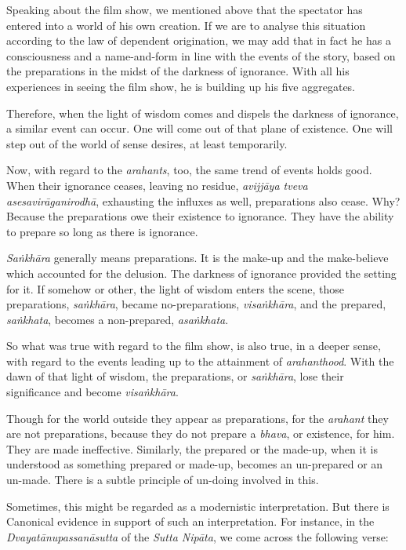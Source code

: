 Speaking about the film show, we mentioned above that the spectator has entered into a world of his own creation. If we are to analyse this situation according to the law of dependent origination, we may add that in fact he has a consciousness and a name-and-form in line with the events of the story, based on the preparations in the midst of the darkness of ignorance. With all his experiences in seeing the film show, he is building up his five aggregates.

Therefore, when the light of wisdom comes and dispels the darkness of ignorance, a similar event can occur. One will come out of that plane of existence. One will step out of the world of sense desires, at least temporarily.

Now, with regard to the \emph{arahants}, too, the same trend of events holds good. When their ignorance ceases, leaving no residue, \emph{avijjāya tveva asesavirāganirodhā}, exhausting the influxes as well, preparations also cease. Why? Because the preparations owe their existence to ignorance. They have the ability to prepare so long as there is ignorance.

\emph{Saṅkhāra} generally means preparations. It is the make-up and the make-believe which accounted for the delusion. The darkness of ignorance provided the setting for it. If somehow or other, the light of wisdom enters the scene, those preparations, \emph{saṅkhāra}, became no-preparations, \emph{visaṅkhāra}, and the prepared, \emph{saṅkhata}, becomes a non-prepared, \emph{asaṅkhata}.

So what was true with regard to the film show, is also true, in a deeper sense, with regard to the events leading up to the attainment of \emph{arahanthood}. With the dawn of that light of wisdom, the preparations, or \emph{saṅkhāra}, lose their significance and become \emph{visaṅkhāra}.

Though for the world outside they appear as preparations, for the \emph{arahant} they are not preparations, because they do not prepare a \emph{bhava}, or existence, for him. They are made ineffective. Similarly, the prepared or the made-up, when it is understood as something prepared or made-up, becomes an un-prepared or an un-made. There is a subtle principle of un-doing involved in this.

Sometimes, this might be regarded as a modernistic interpretation. But there is Canonical evidence in support of such an interpretation. For instance, in the \emph{Dvayatānupassanāsutta} of the \emph{Sutta Nipāta}, we come across the following verse:

